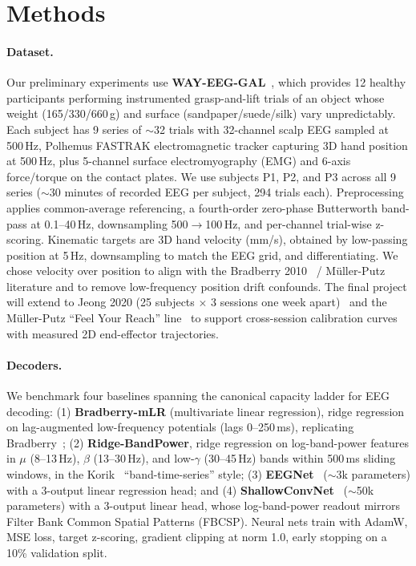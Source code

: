 \documentclass{article}
\begin{document}
\section{Methods}

\paragraph{Dataset.} Our preliminary experiments use \textbf{WAY-EEG-GAL}~\cite{way-eeg-gal}, which provides 12 healthy participants performing instrumented grasp-and-lift trials of an object whose weight (165/330/660\,g) and surface (sandpaper/suede/silk) vary unpredictably. Each subject has 9 series of $\sim$32 trials with 32-channel scalp EEG sampled at 500\,Hz, Polhemus FASTRAK electromagnetic tracker capturing 3D hand position at 500\,Hz, plus 5-channel surface electromyography (EMG) and 6-axis force/torque on the contact plates. We use subjects P1, P2, and P3 across all 9 series ($\sim$30 minutes of recorded EEG per subject, 294 trials each). Preprocessing applies common-average referencing, a fourth-order zero-phase Butterworth band-pass at 0.1--40\,Hz, downsampling 500$\to$100\,Hz, and per-channel trial-wise z-scoring. Kinematic targets are 3D hand velocity (mm/s), obtained by low-passing position at 5\,Hz, downsampling to match the EEG grid, and differentiating. We chose velocity over position to align with the Bradberry 2010~\cite{bradberry2010} / Müller-Putz~\cite{mondini2020} literature and to remove low-frequency position drift confounds. The final project will extend to Jeong 2020 (25 subjects $\times$ 3 sessions one week apart)~\cite{jeong2020} and the Müller-Putz ``Feel Your Reach'' line~\cite{mondini2020} to support cross-session calibration curves with measured 2D end-effector trajectories.

\paragraph{Decoders.} We benchmark four baselines spanning the canonical capacity ladder for EEG decoding: (1) \textbf{Bradberry-mLR} (multivariate linear regression), ridge regression on lag-augmented low-frequency potentials (lags 0--250\,ms), replicating Bradberry~\cite{bradberry2010}; (2) \textbf{Ridge-BandPower}, ridge regression on log-band-power features in $\mu$ (8--13\,Hz), $\beta$ (13--30\,Hz), and low-$\gamma$ (30--45\,Hz) bands within 500\,ms sliding windows, in the Korik~\cite{korik2018} ``band-time-series'' style; (3) \textbf{EEGNet}~\cite{eegnet} ($\sim$3k parameters) with a 3-output linear regression head; and (4) \textbf{ShallowConvNet}~\cite{shallowconv} ($\sim$50k parameters) with a 3-output linear head, whose log-band-power readout mirrors Filter Bank Common Spatial Patterns (FBCSP). Neural nets train with AdamW, MSE loss, target z-scoring, gradient clipping at norm 1.0, early stopping on a 10\% validation split.
\end{document}
